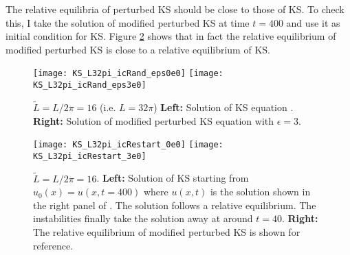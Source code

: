 \begin{description}
{The relative equilibria of perturbed KS should be close to those of KS. To check this, I take the solution of modified perturbed KS at time $t=400$ and use it as initial condition for KS. Figure \ref{fig:modPertKS_L32pi_restart} shows that in fact the relative equilibrium of modified perturbed KS is close to a relative equilibrium of KS.
\begin{figure}
		\centering
		\texttt{[image: KS\_L32pi\_icRand\_eps0e0]}
		\texttt{[image: KS\_L32pi\_icRand\_eps3e0]}
		\caption{$\tilde L=L/2\pi=16$ (i.e. $L=32\pi$) {\bf Left:} Solution of KS equation . {\bf Right:} Solution of modified perturbed KS equation  with $\epsilon=3$.}
		\label{fig:modPertKS_L32pi}
\end{figure}
%
\begin{figure}[h!]
	\centering
	\texttt{[image: KS\_L32pi\_icRestart\_0e0]}
	\texttt{[image: KS\_L32pi\_icRestart\_3e0]}
	\caption{$\tilde L=L/2\pi=16$. {\bf Left:} Solution of KS  starting from $u_0(x)=u(x,t=400)$ where $u(x,t)$ is the solution shown in the right panel of . The solution follows a relative equilibrium. The instabilities finally take the solution away at around $t=40$. {\bf Right:} The relative equilibrium of modified perturbed KS  is shown for reference.}
	\label{fig:modPertKS_L32pi_restart}
\end{figure}
}
\end{description}
